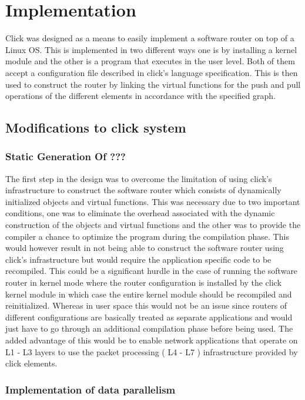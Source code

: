 \documentclass[conference]{IEEEtran}
\begin{document}
\section{Implementation}

Click was designed as a means to easily implement a software router on top of a Linux OS. This is implemented in two different ways one is by installing a kernel module and the other is a program that executes in the user level. Both of them accept a configuration file described in click's language specification. This is then used to construct the router by linking the virtual functions for the push and pull operations of the different elements in accordance with the specified graph.

\subsection{Modifications to click system}

\subsubsection{Static Generation Of ???}
The first step in the design was to overcome the limitation of using click's infrastructure to construct the software router which consists of dynamically initialized objects and virtual functions. This was necessary due to two important conditions, one was to eliminate the overhead associated with the dynamic construction of the objects and virtual functions and the other was to provide the compiler a chance to optimize the program during the compilation phase. This would however result in not being able to construct the software router using click's infrastructure but would require the application specific code to be recompiled. This could be a significant hurdle in the case of running the software router in kernel mode where the router configuration is installed by the click kernel module in which case the entire kernel module should be recompiled and reinitialized. Whereas in user space this would not be an issue since routers of different configurations are basically treated as separate applications and would just have to go through an additional compilation phase before being used. The added advantage of this would be to enable network applications that operate on L1 - L3 layers to use the packet processing ( L4 - L7 ) infrastructure provided by click elements.

\subsubsection{Implementation of data parallelism}
\end{document}
